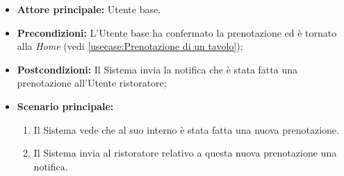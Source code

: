 \label{usecase:Notifica prenotazione}
\begin{itemize}
	\item \textbf{Attore principale:} Utente base.
	
	\item \textbf{Precondizioni:} L'Utente base ha confermato la prenotazione ed è tornato alla \textit{Home} (vedi \autoref{usecase:Prenotazione di un tavolo});

    
	\item \textbf{Postcondizioni:} Il Sistema invia la notifica che è stata fatta una prenotazione all'Utente ristoratore;
     
	\item \textbf{Scenario principale:}
	      \begin{enumerate}
                \item Il Sistema vede che al suo interno è stata fatta una nuova prenotazione.
                \item Il Sistema invia al ristoratore relativo a questa nuova prenotazione una notifica.
	      \end{enumerate}
\end{itemize}